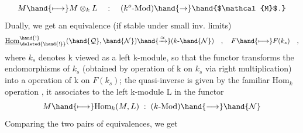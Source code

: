 \[M \hand{\longmapsto} M\otimes_{k}L \quad : \quad (k^{o}\text{-Mod})\hand{\to} \hand{$\mathcal{M}$.}\]
Dually, we get an equivalence (if  stable under small inv. limits)
\[\underline{\text{Hom}}^{\hand{!}}_{\deleted{\hand{!}}}(\hand{\mathcal{Q}},\hand{\mathcal{N}}) \hand{\xrightarrow{\approx}} (k\text{-}\hand{\mathcal{N}}) \quad , \quad F \hand{\longmapsto} F(k_{s}) \quad ,\]
where $k_{s}$ denotes k viewed as a left k-module, so that the \hand{\uline{\textcolor{black}{contravariant}}}
functor  transforms the endomorphisms of $k_{s}$ (obtained by \hand{\uline{\textcolor{black}{right}}} operation
of k on $k_{s}$ via right multiplication) into a \hand{\uline{\textcolor{black}{left}}} operation of k on $F(k_{s})$;
the quasi-inverse is given by the familiar $\text{Hom}_{k}$ operation , it 
associates to the left k-module L in  the functor
\[M \hand{\longmapsto} \text{Hom}_{k}(M,L) \;:\; (k\text{-Mod}) \hand{\longrightarrow} \hand{\mathcal{N}}\]
 Comparing the two pairs of equivalences, we get 

